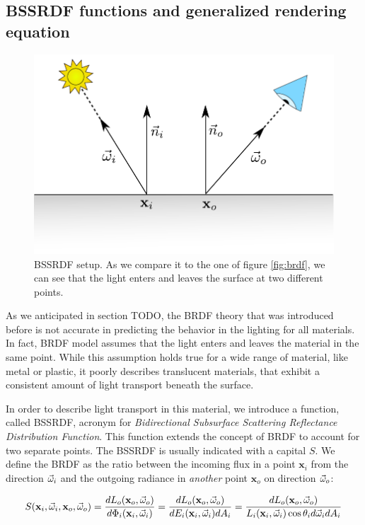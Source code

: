 \subsection{BSSRDF functions and generalized rendering equation}
\begin{figure}
\centering
\includegraphics[width=0.8 \linewidth]{images/bssrdf} 
\caption{BSSRDF setup. As we compare it to the one of figure \ref{fig:brdf}, we can see that the light enters and leaves the surface at two different points.}
\label{fig:bssrdf}
\end{figure}

As we anticipated in section TODO, the BRDF theory that was introduced before is not accurate in predicting the behavior in the lighting for all materials. In fact, BRDF model assumes that the light enters and leaves the material in the same point. While this assumption holds true for a wide range of material, like metal or plastic, it poorly describes translucent materials, that exhibit a consistent amount of light transport beneath the surface. 

In order to describe light transport in this material, we introduce a function, called BSSRDF, acronym for \emph{Bidirectional Subsurface Scattering Reflectance Distribution Function}. This function extends the concept of BRDF to account for two separate points. The BSSRDF is usually indicated with a capital $S$. We define the BRDF as the ratio between the incoming flux in a point $\mathbf{x}_i$ from the direction $\vec{\omega}_i$ and the outgoing radiance in \emph{another} point $\mathbf{x}_o$ on direction $\vec{\omega}_o$:

$$
S(\mathbf{x}_i, \vec{\omega}_i, \mathbf{x}_o, \vec{\omega}_o) = \frac{d L_o(\mathbf{x}_o,\vec{\omega}_o)}{d \Phi_i(\mathbf{x}_i,\vec{\omega}_i)} = \frac{d L_o(\mathbf{x}_o,\vec{\omega}_o)}{d E_i(\mathbf{x}_i,\vec{\omega}_i) d A_i} = \frac{d L_o(\mathbf{x}_o,\vec{\omega}_o)}{L_i(\mathbf{x}_i,\vec{\omega}_i) \cos \theta_i d\vec{\omega}_i d A_i}  
$$

